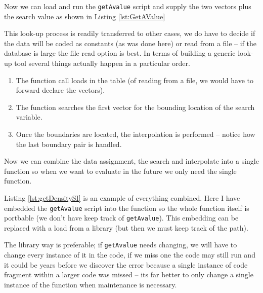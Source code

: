 Now we can load and run the \texttt{getAvalue} script and supply the two vectors plus the search value as shown in Listing \ref{lst:GetAValue}

This look-up process is readily transferred to other cases, we do have to decide if the data will be coded as constants (as was done here) or read from a file -- if the database is large the file read option is best.  In terms of building a generic look-up tool several things actually happen in a particular order.

\begin{enumerate}
\item The function call loads in the table (of reading from a file, we would have to forward declare the vectors).
\item The function searches the first vector for the bounding location of the search variable.
\item Once the boundaries are located, the interpolation is performed -- notice how the last boundary pair is handled.
\end{enumerate}

Now we can combine the data assignment, the search and interpolate into a single function so when we want to evaluate in the future we only need the single function.

Listing \ref{lst:getDensitySI} is an example of everything combined.   Here I have embedded the \texttt{getAvalue} script into the function so the whole function itself is portbable (we don't have keep track of \texttt{getAvalue}).  This embedding can be replaced with a load from a library (but then we must keep track of the path).  

The library way is preferable; if \texttt{getAvalue} needs changing, we will have to change every instance of it in the code, if we miss one the code may still run and it could be years before we discover the error because a single instance of code fragment within a larger code was missed -- its far better to only change a single instance of the function when maintenance is necessary.

